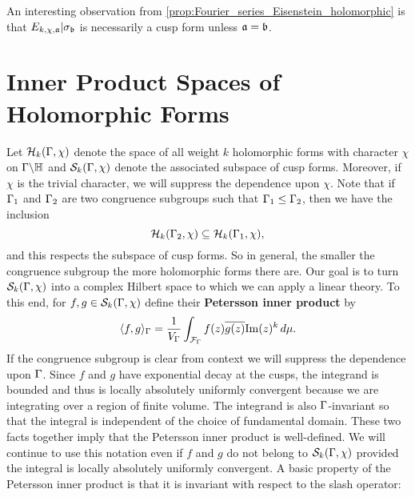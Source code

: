     An interesting observation from \cref{prop:Fourier_series_Eisenstein_holomorphic} is that $E_{k,\chi,\mathfrak{a}}|\sigma_{\mathfrak{b}}$ is necessarily a cusp form unless $\mathfrak{a} = \mathfrak{b}$.
  \section{Inner Product Spaces of Holomorphic Forms}
    Let $\mathcal{H}_{k}(\Gamma,\chi)$ denote the space of all weight $k$ holomorphic forms with character $\chi$ on $\Gamma\backslash\mathbb{H}$ and $\mathcal{S}_{k}(\Gamma,\chi)$ denote the associated subspace of cusp forms. Moreover, if $\chi$ is the trivial character, we will suppress the dependence upon $\chi$. Note that if $\Gamma_{1}$ and $\Gamma_{2}$ are two congruence subgroups such that $\Gamma_{1} \le \Gamma_{2}$, then we have the inclusion
    \[
      \mathcal{H}_{k}(\Gamma_{2},\chi) \subseteq \mathcal{H}_{k}(\Gamma_{1},\chi),
    \]
    and this respects the subspace of cusp forms. So in general, the smaller the congruence subgroup the more holomorphic forms there are. Our goal is to turn $\mathcal{S}_{k}(\Gamma,\chi)$ into a complex Hilbert space to which we can apply a linear theory. To this end, for $f,g \in \mathcal{S}_{k}(\Gamma,\chi)$ define their \textbf{Petersson inner product} by
    \[
      \langle f,g\rangle_{\Gamma} = \frac{1}{V_{\Gamma}}\int_{\mathcal{F}_{\Gamma}}f(z)\overline{g(z)}\mathrm{Im}(z)^{k}\,d\mu.
    \]
    If the congruence subgroup is clear from context we will suppress the dependence upon $\Gamma$. Since $f$ and $g$ have exponential decay at the cusps, the integrand is bounded and thus is locally absolutely uniformly convergent because we are integrating over a region of finite volume. The integrand is also $\Gamma$-invariant so that the integral is independent of the choice of fundamental domain. These two facts together imply that the Petersson inner product is well-defined. We will continue to use this notation even if $f$ and $g$ do not belong to $\mathcal{S}_{k}(\Gamma,\chi)$ provided the integral is locally absolutely uniformly convergent. A basic property of the Petersson inner product is that it is invariant with respect to the slash operator:


